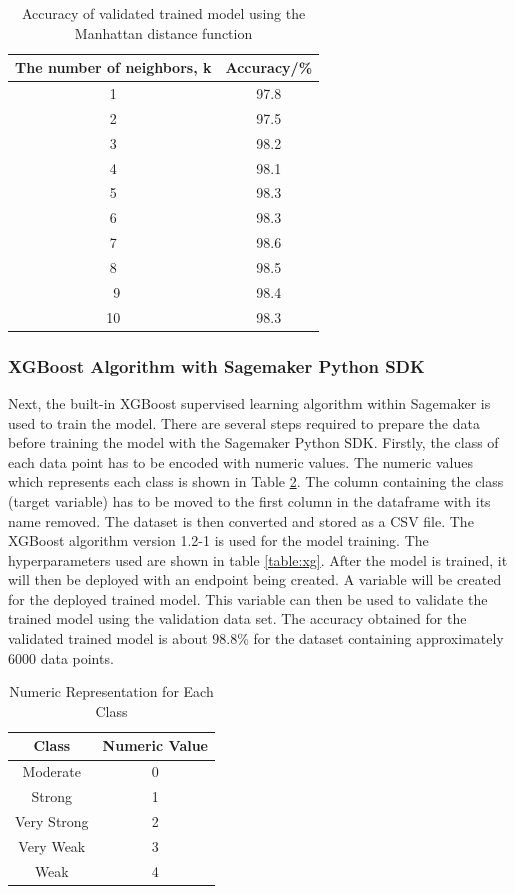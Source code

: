 \begin{table}[ht]
\centering
\begin{center}
\begin{tabular}{ |c|c| } 
  \hline
 The number of neighbors, k  & Accuracy/\%\\ 
  \hline\hline
1 & 97.8\\ 
2 & 97.5\\ 
3 & 98.2\\ 
4 & 98.1\\ 
5 & 98.3\\ 
6 & 98.3\\ 
7 & 98.6\\ 
8 & 98.5\\\ 
9 & 98.4\\ 
10 & 98.3\\ 

 \hline
\end{tabular}
\caption{Accuracy of validated trained model using the Manhattan distance function}
\label{table:manhattan2}
\end{center}
\end{table}

\subsubsection{XGBoost Algorithm with Sagemaker Python SDK}
Next, the built-in XGBoost supervised learning algorithm within Sagemaker is used to train the model. There are several steps required to prepare the data before training the model with the Sagemaker Python SDK. Firstly, the class of each data point has to be encoded with numeric values. The numeric values which represents each class is shown in Table \ref{table:class}. 
The column containing the class (target variable) has to be moved to the first column in the dataframe with its name removed. The dataset is then converted and stored as a CSV file. The XGBoost algorithm version 1.2-1 is used for the model training. The hyperparameters used are shown in table \ref{table:xg}. After the model is trained, it will then be deployed with an endpoint being created. A variable will be created for the deployed trained model. This variable can then be used to validate the trained model using the validation data set. The accuracy obtained for the validated trained model is about 98.8\% for the dataset containing approximately 6000 data points.

\begin{table}[ht]
\centering
\begin{center}
\begin{tabular}{ |c|c| } 
  \hline
 Class  & Numeric Value\\ 
  \hline\hline
Moderate & 0\\ 
Strong & 1\\ 
Very Strong & 2\\ 
Very Weak & 3\\ 
Weak & 4\\ 

 \hline
\end{tabular}
\caption{Numeric Representation for Each Class}
\label{table:class}
\end{center}
\end{table}

